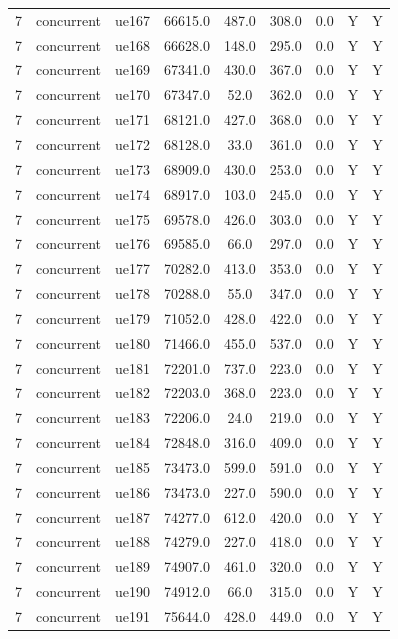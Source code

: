\begin{table}[ht]
\begin{tabular}{|c|c|c|c|c|c|c|c|c|}
7 & concurrent & ue167 & 66615.0 & 487.0 & 308.0 & 0.0 & Y & Y \\
7 & concurrent & ue168 & 66628.0 & 148.0 & 295.0 & 0.0 & Y & Y \\
7 & concurrent & ue169 & 67341.0 & 430.0 & 367.0 & 0.0 & Y & Y \\
7 & concurrent & ue170 & 67347.0 & 52.0 & 362.0 & 0.0 & Y & Y \\
7 & concurrent & ue171 & 68121.0 & 427.0 & 368.0 & 0.0 & Y & Y \\
7 & concurrent & ue172 & 68128.0 & 33.0 & 361.0 & 0.0 & Y & Y \\
7 & concurrent & ue173 & 68909.0 & 430.0 & 253.0 & 0.0 & Y & Y \\
7 & concurrent & ue174 & 68917.0 & 103.0 & 245.0 & 0.0 & Y & Y \\
7 & concurrent & ue175 & 69578.0 & 426.0 & 303.0 & 0.0 & Y & Y \\
7 & concurrent & ue176 & 69585.0 & 66.0 & 297.0 & 0.0 & Y & Y \\
7 & concurrent & ue177 & 70282.0 & 413.0 & 353.0 & 0.0 & Y & Y \\
7 & concurrent & ue178 & 70288.0 & 55.0 & 347.0 & 0.0 & Y & Y \\
7 & concurrent & ue179 & 71052.0 & 428.0 & 422.0 & 0.0 & Y & Y \\
7 & concurrent & ue180 & 71466.0 & 455.0 & 537.0 & 0.0 & Y & Y \\
7 & concurrent & ue181 & 72201.0 & 737.0 & 223.0 & 0.0 & Y & Y \\
7 & concurrent & ue182 & 72203.0 & 368.0 & 223.0 & 0.0 & Y & Y \\
7 & concurrent & ue183 & 72206.0 & 24.0 & 219.0 & 0.0 & Y & Y \\
7 & concurrent & ue184 & 72848.0 & 316.0 & 409.0 & 0.0 & Y & Y \\
7 & concurrent & ue185 & 73473.0 & 599.0 & 591.0 & 0.0 & Y & Y \\
7 & concurrent & ue186 & 73473.0 & 227.0 & 590.0 & 0.0 & Y & Y \\
7 & concurrent & ue187 & 74277.0 & 612.0 & 420.0 & 0.0 & Y & Y \\
7 & concurrent & ue188 & 74279.0 & 227.0 & 418.0 & 0.0 & Y & Y \\
7 & concurrent & ue189 & 74907.0 & 461.0 & 320.0 & 0.0 & Y & Y \\
7 & concurrent & ue190 & 74912.0 & 66.0 & 315.0 & 0.0 & Y & Y \\
7 & concurrent & ue191 & 75644.0 & 428.0 & 449.0 & 0.0 & Y & Y \\

\end{tabular}
\end{table}
